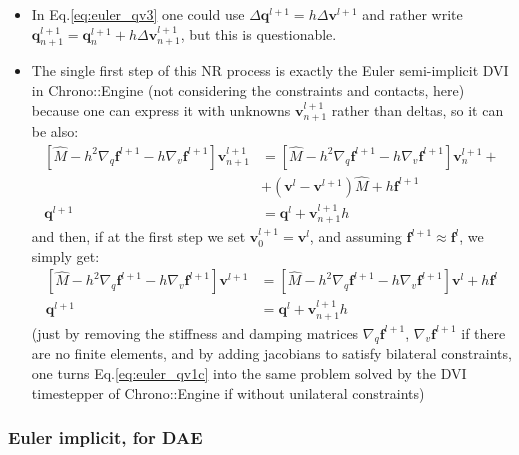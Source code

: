 \documentclass{digitaldynamics}
\def\vect#1{\bm{#1}}
\def\matr#1{{#1}}
\begin{document}
\begin{itemize}

	\item 
	In Eq.\ref{eq:euler_qv3} one could use $\Delta\vect{q}^{l+1}=h \Delta\vect{v}^{l+1}$ and rather write 
	$\vect{q}^{l+1}_{n+1} = \vect{q}^{l+1}_{n} + h \Delta\vect{v}^{l+1}_{n+1}$, but this is questionable.
	
	\item 
	The single first step of this NR process is exactly the Euler semi-implicit DVI in Chrono::Engine
	(not considering the constraints and contacts, here) because 
	one can express it with unknowns $\vect{v}^{l+1}_{n+1}$ rather than deltas, so it can be also:
%
\begin{align}
\left[ \hat{\matr{M}} - h^2 \nabla_q \vect{f}^{l+1} - h \nabla_v \vect{f}^{l+1} \right] \vect{v}^{l+1}_{n+1} &= 
\left[ \hat{\matr{M}} - h^2 \nabla_q \vect{f}^{l+1} - h \nabla_v \vect{f}^{l+1} \right] \vect{v}^{l+1}_{n} + \nonumber \\
& + \left( \vect{v}^{l}-\vect{v}^{l+1} \right) \hat{\matr{M}} + h \vect{f}^{l+1} 
\label{eq:euler_qv1b}
\\
\vect{q}^{l+1} &= \vect{q}^{l} + \vect{v}^{l+1}_{n+1} h
\label{eq:euler_qv2b}
\end{align}
%
and then, if at the first step we set $\vect{v}^{l+1}_0 = \vect{v}^{l}$, and assuming $\vect{f}^{l+1} \approx \vect{f}^{l}$, we simply get:
%
\begin{align}
\left[ \hat{\matr{M}} - h^2 \nabla_q \vect{f}^{l+1} - h \nabla_v \vect{f}^{l+1} \right] \vect{v}^{l+1} &= 
\left[ \hat{\matr{M}} - h^2 \nabla_q \vect{f}^{l+1} - h \nabla_v \vect{f}^{l+1} \right] \vect{v}^{l} + h \vect{f}^{l} 
\label{eq:euler_qv1c}
\\
\vect{q}^{l+1} &= \vect{q}^{l} + \vect{v}^{l+1}_{n+1} h
\label{eq:euler_qv2c}
\end{align}
%
(just by removing the stiffness and damping matrices $\nabla_q \vect{f}^{l+1}$, $\nabla_v \vect{f}^{l+1}$ if there are no finite elements, and by adding jacobians to satisfy bilateral constraints, one turns Eq.\ref{eq:euler_qv1c} into the same problem solved by the DVI timestepper of Chrono::Engine if without unilateral constraints)

\end{itemize}




\subsubsection{Euler implicit, for DAE}
\end{document}
